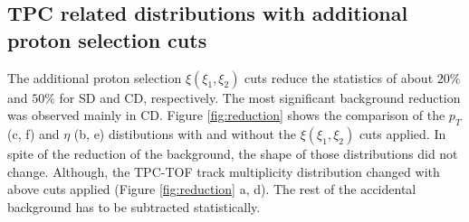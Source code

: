 \subsection{TPC related distributions with additional proton selection cuts}
The additional proton selection $\xi\left(\xi_1,\xi_2\right)$ cuts reduce the statistics of about $20\%$ and $50\%$ for SD and CD, respectively. The most significant background reduction was observed mainly in CD. Figure \ref{fig:reduction} shows the comparison of the $p_T$ (c, f) and $\eta$ (b, e) distibutions with and without the $\xi\left(\xi_1,\xi_2\right)$ cuts applied. In spite of the reduction of the background, the shape of those distributions did not change. Although, the TPC-TOF track multiplicity distribution changed with above cuts applied (Figure \ref{fig:reduction} a, d). The rest of the accidental background has to be  subtracted statistically.
